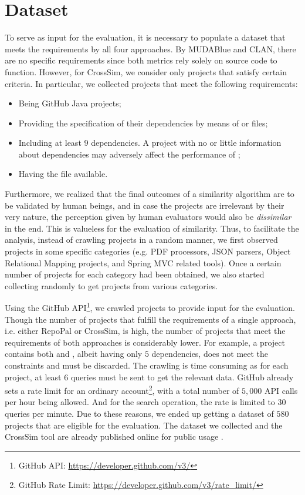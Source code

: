 \section{Dataset} \label{sec:Dataset}

To serve as input for the evaluation, it is necessary to populate a dataset that meets the requirements by all four approaches. By MUDABlue and CLAN, there are no specific requirements since both metrics rely solely on source code to function. However, for CrossSim, we consider only projects that satisfy certain criteria. In particular, we collected projects that meet the following requirements:

\begin{itemize}
	\item Being GitHub Java projects; 
	\item Providing the specification of their dependencies by means of  or  files;
	\item Including at least $9$ dependencies. A project with no or little information about dependencies may adversely affect the performance of \CrossSim; 
	\item Having the  file available.
\end{itemize}

Furthermore, we realized that the final outcomes of a similarity algorithm are to be validated by human beings, and in case the projects are irrelevant by their very nature, the perception given by human evaluators would also be \emph{dissimilar} in the end. This is valueless for the evaluation of similarity. Thus, to facilitate the analysis, instead of crawling projects in a random manner, we first observed projects in some specific categories (e.g. PDF processors, JSON parsers, Object Relational Mapping projects, and Spring MVC related tools). Once a certain number of projects for each category had been obtained, we also started collecting randomly to get projects from various categories.

Using the GitHub API\footnote{GitHub API: \url{https://developer.github.com/v3/}}, we crawled projects to provide input for the evaluation. Though the number of projects that fulfill the requirements of a single approach, i.e. either RepoPal or CrossSim, is high, the number of projects that meet the requirements of both approaches is considerably lower. For example, a project contains both  and , albeit having only $5$ dependencies, does not meet the constraints and must be discarded. The crawling is time consuming as for each project, at least $6$ queries must be sent to get the relevant data. GitHub already sets a rate limit for an ordinary account\footnote{GitHub Rate Limit: \url{https://developer.github.com/v3/rate_limit/}}, with a total number of $5,000$ API calls per hour being allowed. And for the search operation, the rate is limited to $30$ queries per minute. Due to these reasons, we ended up getting a dataset of $580$ projects that are eligible for the evaluation. The dataset we collected and the CrossSim tool are already published online for public usage \cite{CROSSSIM-DATA}.

